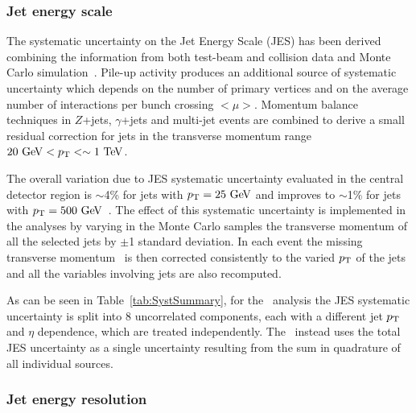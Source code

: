 \subsubsection{Jet energy scale}
\label{sec:syst_jes}

The systematic uncertainty on the Jet Energy Scale (JES) 
has been derived combining the information from both test-beam 
and collision data and Monte Carlo
simulation~\cite{ATLASJetEnergyMeasurement, insitu5,insitu6}.  
Pile-up activity produces an additional source of systematic 
uncertainty which depends on the number of primary vertices
and on the average number of interactions per bunch crossing $<\mu>$. 
Momentum balance techniques in $Z$+jets, $\gamma$+jets and 
multi-jet events are combined to derive a small residual correction
for jets in the transverse momentum range $20\gev<\pt<\sim1\tev$.

The overall variation due to JES systematic uncertainty 
evaluated in the central detector region 
is $\sim$4\% for jets with $\pt=25\gev$ and improves to $\sim$1\% for  
jets with $\pt=500\gev$~\cite{jesuncertainty}.
The effect of this systematic uncertainty is 
implemented in the analyses by varying in the Monte Carlo samples the 
transverse momentum of all the selected jets by $\pm$1 standard deviation.
In each event the missing transverse momentum \met\ is then corrected consistently to 
the varied $\pt$ of the jets and all the variables involving jets are also
recomputed.

As can be seen in Table~\ref{tab:SystSummary}, for the \htx\ analysis
the JES systematic uncertainty is split into 8
uncorrelated components, each with a different jet $\pt$ and $\eta$
dependence, which are treated independently.
The \wbx\ instead uses the total JES uncertainty as a single uncertainty
resulting from the sum in quadrature of all individual sources.



\subsubsection{Jet energy resolution}
\label{sec:syst_jer}

